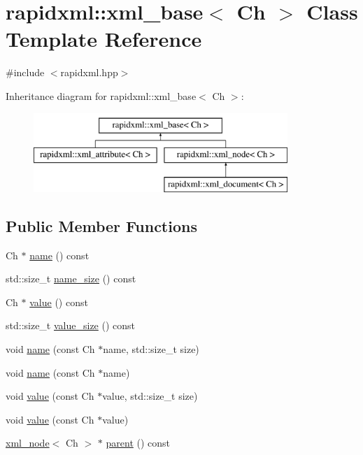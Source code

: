 \hypertarget{classrapidxml_1_1xml__base}{\section{rapidxml\-:\-:xml\-\_\-base$<$ Ch $>$ Class Template Reference}
\label{classrapidxml_1_1xml__base}
}


{\ttfamily \#include $<$rapidxml.\-hpp$>$}

Inheritance diagram for rapidxml\-:\-:xml\-\_\-base$<$ Ch $>$\-:\begin{figure}[H]
\begin{center}
\leavevmode
\includegraphics[height=3.000000cm]{classrapidxml_1_1xml__base}
\end{center}
\end{figure}
\subsection*{Public Member Functions}
\begin{DoxyCompactItemize}
\item 
Ch $\ast$ \hyperlink{classrapidxml_1_1xml__base_a9a09739310469995db078ebd0da3ed45}{name} () const 
\item 
std\-::size\-\_\-t \hyperlink{classrapidxml_1_1xml__base_a7e7f98b3d01e1eab8dc1ca69aad9af84}{name\-\_\-size} () const 
\item 
Ch $\ast$ \hyperlink{classrapidxml_1_1xml__base_adcdaccff61c665f039d9344e447b7445}{value} () const 
\item 
std\-::size\-\_\-t \hyperlink{classrapidxml_1_1xml__base_a9fcf201ed0915ac18dd43b0b5dcfaf32}{value\-\_\-size} () const 
\item 
void \hyperlink{classrapidxml_1_1xml__base_ae55060ae958c6e6465d6c8db852ec6ce}{name} (const Ch $\ast$name, std\-::size\-\_\-t size)
\item 
void \hyperlink{classrapidxml_1_1xml__base_a4611ddc82ac83a527c65606600eb2a0d}{name} (const Ch $\ast$name)
\item 
void \hyperlink{classrapidxml_1_1xml__base_a3b183c2db7022a6d30494dd2f0ac11e9}{value} (const Ch $\ast$value, std\-::size\-\_\-t size)
\item 
void \hyperlink{classrapidxml_1_1xml__base_a81e63ec4bfd2d7ef0a6c2ed49be6e623}{value} (const Ch $\ast$value)
\item 
\hyperlink{classrapidxml_1_1xml__node}{xml\-\_\-node}$<$ Ch $>$ $\ast$ \hyperlink{classrapidxml_1_1xml__base_a7f31ae930f93852830234db1ae59c4c4}{parent} () const 
\end{DoxyCompactItemize}
